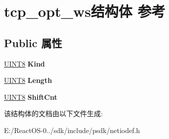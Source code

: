 \hypertarget{structtcp__opt__ws}{}\section{tcp\+\_\+opt\+\_\+ws结构体 参考}
\label{structtcp__opt__ws}
\subsection*{Public 属性}
\begin{DoxyCompactItemize}
\item 
\mbox{\label{structtcp__opt__ws_a1dd4336ce065d7583a853ac36e018726}} 
\hyperlink{_processor_bind_8h_ab27e9918b538ce9d8ca692479b375b6a}{U\+I\+N\+T8} {\bfseries Kind}
\item 
\mbox{\label{structtcp__opt__ws_a1e4396d36a96b90aecee1165f0704a90}} 
\hyperlink{_processor_bind_8h_ab27e9918b538ce9d8ca692479b375b6a}{U\+I\+N\+T8} {\bfseries Length}
\item 
\mbox{\label{structtcp__opt__ws_ad0019fbdfc5b866a088d433bf4ec2f09}} 
\hyperlink{_processor_bind_8h_ab27e9918b538ce9d8ca692479b375b6a}{U\+I\+N\+T8} {\bfseries Shift\+Cnt}
\end{DoxyCompactItemize}


该结构体的文档由以下文件生成\+:\begin{DoxyCompactItemize}
\item 
E\+:/\+React\+O\+S-\/0../sdk/include/psdk/netiodef.\+h\end{DoxyCompactItemize}
